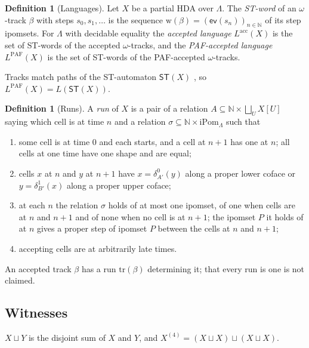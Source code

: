 \documentclass{lmcs}
\theoremstyle{definition}
\newtheorem{definition}[theorem]{Definition}
\theoremstyle{remark}
\newcommand{\Nn}{\mathbb{N}}
\newcommand{\ip}{\mathsf{ev}}
\newcommand{\Ipom}{\mathrm{iPom}}
\newcommand{\Tr}{\mathrm{tr}}
\providecommand{\dsum}{\sqcup}
\providecommand{\STa}{\mathsf{ST}}
\providecommand{\stw}{\mathrm{w}}
\providecommand{\LangA}[1]{L^{\mathrm{acc}}(#1)}
\providecommand{\LangPAF}[1]{L^{\mathrm{PAF}}(#1)}
\providecommand{\dsum}{\sqcup}
\begin{document}
\begin{definition}[Languages]\label{def:languages}
Let $X$ be a partial HDA over $\Lambda$. The \emph{ST-word} of an $\omega$-track $\beta$ with steps $s_0,s_1,\dots$
is the sequence $\stw(\beta)=(\ip(s_n))_{n\in\Nn}$ of its step
ipomsets. For $\Lambda$ with decidable equality the \emph{accepted language} $\LangA{X}$ is the set of
ST-words of the accepted $\omega$-tracks, and the \emph{PAF-accepted language}
$\LangPAF{X}$ is the set of ST-words of the PAF-accepted $\omega$-tracks.
\end{definition}

Tracks match paths of the ST-automaton $\STa(X)$
\cite{PAF25}, so $\LangPAF{X}=L(\STa(X))$.

\begin{definition}[Runs]\label{def:run}
A \emph{run} of $X$ is a pair of a relation $A\subseteq\Nn\times\textstyle\bigsqcup_U X[U]$ saying which cell is at
time $n$ and a relation $\sigma\subseteq\Nn\times\Ipom_\Lambda$ such that
\begin{enumerate}
\item some cell is at time $0$ and each starts, and a cell at $n+1$ has one at $n$; all
  cells at one time have one shape and are equal;
\item cells $x$ at $n$ and $y$ at $n+1$ have $x=\delta^0_{A'}(y)$ along a proper lower coface or
  $y=\delta^1_{B'}(x)$ along a proper upper coface;
\item at each $n$ the relation $\sigma$ holds of at most one ipomset, of one when cells are at $n$ and $n+1$ and of
  none when no cell is at $n+1$; the ipomset $P$ it holds of at $n$ gives a proper step of ipomset $P$ between the
  cells at $n$ and $n+1$;
\item accepting cells are at arbitrarily late times.
\end{enumerate}
\end{definition}

An accepted track $\beta$ has a run $\Tr(\beta)$ determining it; that every run is one is not claimed.

\subsection{Witnesses}\label{ssec:witnesses}

$X\dsum Y$ is the disjoint sum of $X$ and $Y$, and
$X^{(4)}=(X\dsum X)\dsum(X\dsum X)$.
\end{document}
